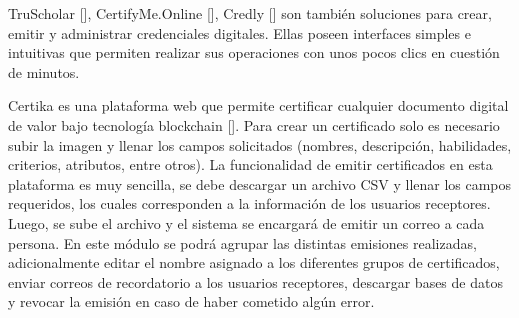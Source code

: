 
%
%
%
%

TruScholar [\cite{86}], CertifyMe.Online [\cite{85}], Credly [\cite{89}] son también soluciones para crear, emitir y administrar credenciales digitales. Ellas poseen interfaces simples e intuitivas que permiten realizar sus operaciones con unos pocos clics en cuestión de minutos.

%

Certika es una plataforma web que permite certificar cualquier documento digital de valor bajo tecnología blockchain [\cite{88}]. Para crear un certificado solo es necesario subir la imagen y llenar los campos solicitados (nombres, descripción, habilidades, criterios, atributos, entre otros). La funcionalidad de emitir certificados en esta plataforma es muy sencilla, se debe descargar un archivo CSV y llenar los campos requeridos, los cuales corresponden a la información de los usuarios receptores. Luego, se sube el archivo y el sistema se encargará de emitir un correo a cada persona. En este módulo se podrá agrupar las distintas emisiones realizadas, adicionalmente editar el nombre asignado a los diferentes grupos de certificados, enviar correos de recordatorio a los usuarios receptores, descargar bases de datos y revocar la emisión en caso de haber cometido algún error.

